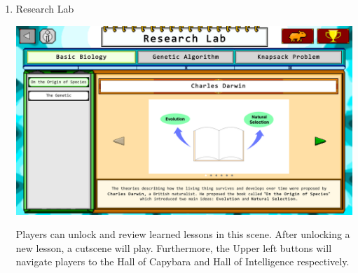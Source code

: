 \documentclass[12pt,oneside,openright,a4paper]{cpe-english-project}
\begin{document}
\begin{enumerate}
	\item Research Lab \\
	\begin{minipage}[c]{\textwidth}\centering
	\includegraphics[width=14cm]{figure/screenshot/screenshot-researchLab.png}
	\end{minipage}
	Players can unlock and review learned lessons in this scene. After unlocking a new lesson, a cutscene will play. Furthermore, the Upper left buttons will navigate players to the Hall of Capybara and Hall of Intelligence respectively.


\end{enumerate}
\end{document}
